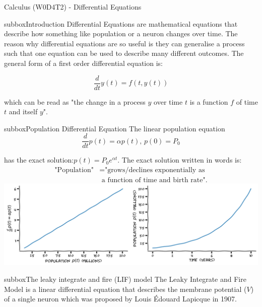 \begin{textbox}{Calculus (W0D4T2) - Differential Equations}
\begin{subbox}{subbox}{Introduction}
\scriptsize
Differential Equations are mathematical equations that describe how something like population or a neuron changes over time. The reason why differential equations are so useful is they can generalise a process such that one equation can be used to describe many different outcomes.
The general form of a first order differential equation is:

\begin{equation}
\frac{d}{dt}y(t) = f\left( t,y(t) \right)
\end{equation}

which can be read as "the change in a process $y$ over time $t$ is a function $f$ of time $t$ and itself $y$".

\end{subbox}
\begin{subbox}{subbox}{Population Differential Equation}
\scriptsize
The linear population equation 
\begin{equation}
\frac{d}{dt}p(t) = \alpha p(t), \, p(0)=P_0
\end{equation}

has the exact solution:$p(t) = P_0 e^{\alpha t}.$
The exact solution written in words is: 
\begin{align*}
\text{"Population"} &= \text{"grows/declines exponentially as}\\ &\text{ a function of time and birth rate"}.
\end{align*}
\centering
\includegraphics[scale=0.15]{Figures/PreCourse/CFigure5.png}
\end{subbox}
\begin{subbox}{subbox}{The leaky integrate and fire (LIF) model}
\scriptsize
The Leaky Integrate and Fire Model is a linear differential equation that describes the membrane potential ($V$) of a single neuron which was proposed by Louis Édouard Lapicque in 1907.


\end{subbox}
\end{textbox}
